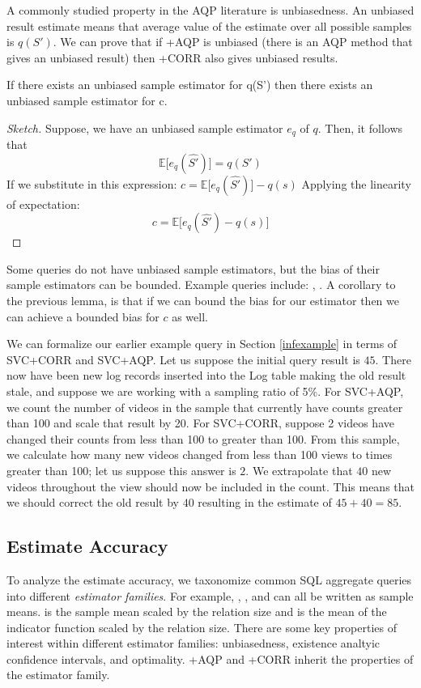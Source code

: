 A commonly studied property in the AQP literature is unbiasedness.
An unbiased result estimate means that average value of the estimate over all possible samples is $q(S')$.
We can prove that if \svcnospace+AQP is unbiased (there is an AQP method that gives an unbiased result) then \svcnospace+CORR also gives unbiased results.
\begin{lemma}\label{lemma:unbiased}
If there exists an unbiased sample estimator for q(S') then there exists an unbiased sample estimator for c.
\end{lemma}
\begin{proof}[Sketch] 
Suppose, we have an unbiased sample estimator $e_q$ of $q$. 
Then, it follows that \[\mathbb{E}\big[e_q(\hat{S'})\big] = q(S')\]
If we substitute in this expression:
$c = \mathbb{E}\big[e_q(\hat{S'})\big] -q(s) $
Applying the linearity of expectation:
\[ c = \mathbb{E}\big[e_q(\hat{S'}) - q(s)\big] \]
\end{proof}
Some queries do not have unbiased sample estimators, but the bias of their sample estimators can be bounded. Example queries include: \medfunc, \percfunc.
A corollary to the previous lemma, is that if we can bound the bias for our estimator then we can achieve a bounded bias for $c$ as well.


\begin{example}
We can formalize our earlier example query in Section \ref{infexample} in terms of SVC+CORR and SVC+AQP.
Let us suppose the initial query result is $45$.
There now have been new log records inserted into the Log table making the old result stale, and suppose we are working with a sampling ratio of 5\%.
For SVC+AQP, we count the number of videos in the sample that currently have counts greater than 100 and scale that result by 20.
For SVC+CORR, suppose 2 videos have changed their counts from less than 100 to greater than 100.
From this sample, we calculate how many new videos changed from less than 100 views to times greater than 100; let us suppose this answer is $2$.
We extrapolate that $40$ new videos throughout the view should now be included in the count.
This means that we should correct the old result by $40$ resulting in the estimate of $45+40 = 85$.
\end{example}

\subsection{Estimate Accuracy}
To analyze the estimate accuracy, we taxonomize common SQL aggregate queries into different \emph{estimator families}.
For example, \sumfunc, \countfunc, and \avgfunc can all be written as sample means.
\sumfunc is the sample mean scaled by the relation size and \countfunc is the mean of the indicator function scaled by the relation size.
There are some key properties of interest within different estimator families: unbiasedness, existence analtyic confidence intervals, and optimality.
\svcnospace+AQP and \svcnospace+CORR inherit the properties of the estimator family.

